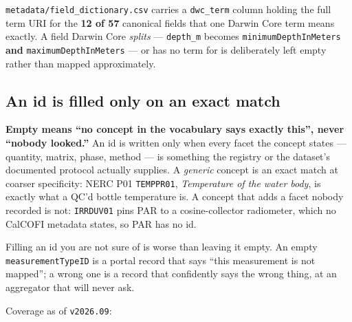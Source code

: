 \documentclass[
  letterpaper,
  DIV=11,
  numbers=noendperiod]{scrreprt}
\begin{document}
\texttt{metadata/field\_dictionary.csv} carries a \texttt{dwc\_term}
column holding the full term URI for the \textbf{12 of 57} canonical
fields that one Darwin Core term means exactly. A field Darwin Core
\emph{splits} --- \texttt{depth\_m} becomes
\texttt{minimumDepthInMeters} \textbf{and} \texttt{maximumDepthInMeters}
--- or has no term for is deliberately left empty rather than mapped
approximately.

\subsection{An id is filled only on an exact
match}\label{an-id-is-filled-only-on-an-exact-match}

\textbf{Empty means ``no concept in the vocabulary says exactly this'',
never ``nobody looked.''} An id is written only when every facet the
concept states --- quantity, matrix, phase, method --- is something the
registry or the dataset's documented protocol actually supplies. A
\emph{generic} concept is an exact match at coarser specificity: NERC
P01 \texttt{TEMPPR01}, \emph{Temperature of the water body}, is exactly
what a QC'd bottle temperature is. A concept that adds a facet nobody
recorded is not: \texttt{IRRDUV01} pins PAR to a cosine-collector
radiometer, which no CalCOFI metadata states, so PAR has no id.

Filling an id you are not sure of is worse than leaving it empty. An
empty \texttt{measurementTypeID} is a portal record that says ``this
measurement is not mapped''; a wrong one is a record that confidently
says the wrong thing, at an aggregator that will never ask.

Coverage as of \texttt{v2026.09}:
\end{document}
